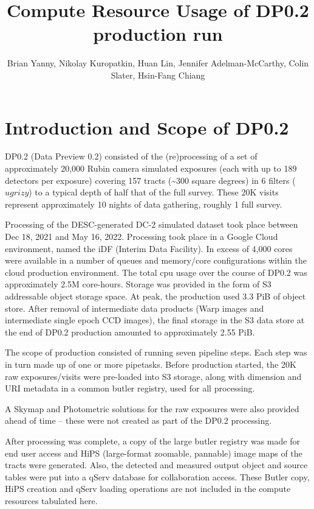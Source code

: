 \documentclass[OPS,authoryear,toc]{lsstdoc}
\title{Compute Resource Usage of DP0.2 production run}
\author{%
Brian Yanny, Nikolay Kuropatkin, Huan Lin, Jennifer Adelman-McCarthy, Colin Slater, Hsin-Fang Chiang
}
\date{\vcsDate}
\begin{document}
\maketitle


\section{Introduction and Scope of DP0.2}

DP0.2 (Data Preview 0.2) consisted of the (re)processing of a 
set of approximately 20,000 Rubin camera simulated exposures (each with up to
189 detectors per exposure) covering 157 tracts 
(\sim 300 square degrees) in 6 filters ($ugrizy$) to a typical 
depth of half that of the full survey.  These 20K visits represent 
approximately 10 nights of data gathering, roughly 1%
full survey.

Processing of the DESC-generated DC-2 simulated dataset \citep{DESC} took place between Dec 18, 2021 and May 16, 2022.  Processing took place in a Google Cloud environment, named the iDF (Interim Data Facility).  In excess of 4,000 cores
were available in a number of queues and memory/core configurations
within the cloud production environment.  The total cpu usage over the 
course of DP0.2 was approximately 2.5M core-hours. Storage was provided 
in the form of S3 addressable object storage space.  At peak, the production 
used 3.3 PiB of object store. After removal of intermediate data products
(Warp images and intermediate single epoch CCD images), the final storage
in the S3 data store at the end of DP0.2 production amounted to approximately
2.55 PiB. 

The scope of production consisted of running seven pipeline steps. Each step
was in turn made up of one or more pipetasks.   Before production
started, the 20K raw exposures/visits were pre-loaded into S3 storage, along
with dimension and URI metadata in a common butler registry, 
used for all processing.  

A Skymap and Photometric solutions for the 
raw exposures were also provided ahead of time -- these were not created
as part of the DP0.2 processing.

After processing was complete, a copy of the large butler registry was made
for end user access and HiPS (large-format zoomable, pannable) image maps 
of the tracts were generated. Also, the detected and measured output object 
and source tables were put into a qServ database for collaboration
access.  These Butler copy, HiPS creation and qServ loading operations
are not included in the compute resources tabulated here. 
\end{document}
